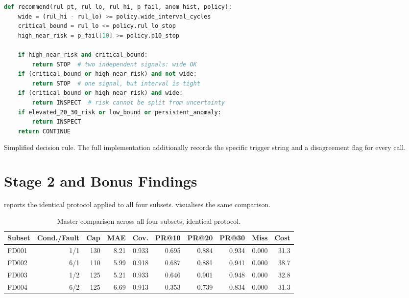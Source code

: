 \documentclass[9pt,a4paper,twocolumn,twoside]{rho-class/rho}
\begin{document}
    \begin{code}
    \begin{lstlisting}[language=Python, basicstyle=\ttfamily\footnotesize, columns=fullflexible, breaklines=true]
def recommend(rul_pt, rul_lo, rul_hi, p_fail, anom_hist, policy):
    wide = (rul_hi - rul_lo) >= policy.wide_interval_cycles
    critical_bound = rul_lo <= policy.rul_lo_stop
    high_near_risk = p_fail[10] >= policy.p10_stop

    if high_near_risk and critical_bound:
        return STOP  # two independent signals: wide OK
    if (critical_bound or high_near_risk) and not wide:
        return STOP  # one signal, but interval is tight
    if (critical_bound or high_near_risk) and wide:
        return INSPECT  # risk cannot be split from uncertainty
    if elevated_20_30_risk or low_bound or persistent_anomaly:
        return INSPECT
    return CONTINUE
    \end{lstlisting}
    \caption{Simplified decision rule. The full implementation additionally records the specific trigger string and a disagreement flag for every call.}
    \label{lst:policy}
    \end{code}

\section{Stage 2 and Bonus Findings}

     reports the identical protocol applied to all four subsets.  visualises the same comparison.

    \begin{table}[t]
        \centering
        \caption{Master comparison across all four subsets, identical protocol.}
        \label{tab:master}
        \begin{tabular}{lrrrrrrrrr}
        \toprule
        \textbf{Subset} & \textbf{Cond./Fault} & \textbf{Cap} & \textbf{MAE} & \textbf{Cov.} & \textbf{PR@10} & \textbf{PR@20} & \textbf{PR@30} & \textbf{Miss} & \textbf{Cost} \\
        \midrule
        FD001 & 1/1 & 130 & 8.21 & 0.933 & 0.695 & 0.884 & 0.934 & 0.000 & 31.3 \\
        FD002 & 6/1 & 110 & 5.99 & 0.918 & 0.687 & 0.881 & 0.941 & 0.000 & 38.7 \\
        FD003 & 1/2 & 125 & 5.21 & 0.933 & 0.646 & 0.901 & 0.948 & 0.000 & 32.8 \\
        FD004 & 6/2 & 125 & 6.69 & 0.913 & 0.353 & 0.739 & 0.834 & 0.000 & 31.3 \\
        \bottomrule
        \end{tabular}
    \end{table}
\end{document}
